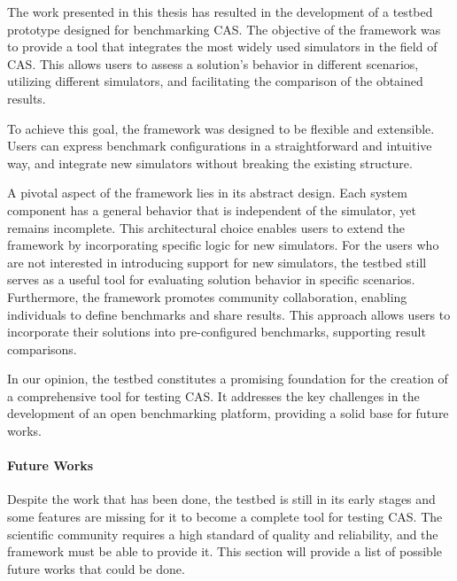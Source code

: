 \documentclass[12pt,a4paper,openright,twoside]{book}
\begin{document}
The work presented in this thesis has resulted in the development of a testbed prototype designed for benchmarking \ac*{CAS}.
The objective of the framework was to provide a tool that integrates the most widely used simulators in the field of \ac*{CAS}.
This allows users to assess a solution's behavior in different scenarios, utilizing different simulators, and facilitating the comparison of the obtained results.

To achieve this goal, the framework was designed to be flexible and extensible.
Users can express benchmark configurations in a straightforward and intuitive way, and integrate new simulators without breaking the existing structure.

A pivotal aspect of the framework lies in its abstract design. 
Each system component has a general behavior that is independent of the simulator, yet remains incomplete.
This architectural choice enables users to extend the framework by incorporating specific logic for new simulators.
For the users who are not interested in introducing support for new simulators, the testbed still serves as a useful tool for evaluating solution behavior in specific scenarios.
Furthermore, the framework promotes community collaboration, enabling individuals to define benchmarks and share results.
This approach allows users to incorporate their solutions into pre-configured benchmarks, supporting result comparisons.

In our opinion, the testbed constitutes a promising foundation for the creation of a comprehensive tool for testing \ac*{CAS}.
It addresses the key challenges in the development of an open benchmarking platform, providing a solid base for future works.

\paragraph*{Future Works}

Despite the work that has been done, the testbed is still in its early stages and some features are missing for it to become a complete tool for testing \ac*{CAS}.
The scientific community requires a high standard of quality and reliability, and the framework must be able to provide it.
This section will provide a list of possible future works that could be done.
\end{document}
